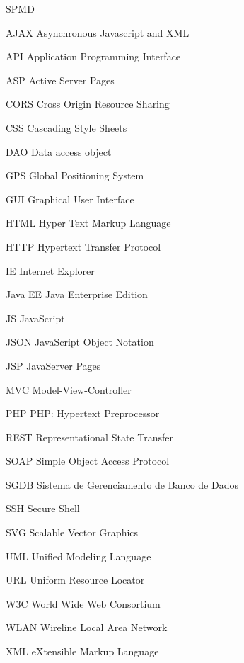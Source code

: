 \begin{listofabbrv}{SPMD}
        \item[AJAX] Asynchronous Javascript and XML 
        \item[API] Application Programming Interface 
        \item[ASP] Active Server Pages
        \item[CORS] Cross Origin Resource Sharing
        \item[CSS] Cascading Style Sheets
        \item[DAO] Data access object
        \item[GPS] Global Positioning System 
        \item[GUI] Graphical User Interface
        \item[HTML] Hyper Text Markup Language
        \item[HTTP] Hypertext Transfer Protocol
        \item[IE] Internet Explorer
        \item[Java EE] Java Enterprise Edition
        \item[JS] JavaScript
        \item[JSON] JavaScript Object Notation
        \item[JSP] JavaServer Pages 
        \item[MVC] Model-View-Controller
        \item[PHP] PHP: Hypertext Preprocessor
        \item[REST] Representational State Transfer
        \item[SOAP] Simple Object Access Protocol
        \item[SGDB] Sistema de Gerenciamento de Banco de Dados
        \item[SSH] Secure Shell
        \item[SVG] Scalable Vector Graphics
        \item[UML] Unified Modeling Language
        \item[URL] Uniform Resource Locator
        \item[W3C] World Wide Web Consortium
        \item[WLAN] Wireline Local Area Network
        \item[XML] eXtensible Markup Language
\end{listofabbrv}